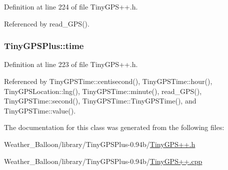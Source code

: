 Definition at line 224 of file Tiny\+G\+P\+S++.\+h.



Referenced by read\+\_\+\+G\+P\+S().

\subsubsection[{\texorpdfstring{time}{time}}]{ Tiny\+G\+P\+S\+Plus\+::time}\hypertarget{class_tiny_g_p_s_plus_a377c975527fa24b45fb86356505eb134}{}\label{class_tiny_g_p_s_plus_a377c975527fa24b45fb86356505eb134}


Definition at line 223 of file Tiny\+G\+P\+S++.\+h.



Referenced by Tiny\+G\+P\+S\+Time\+::centisecond(), Tiny\+G\+P\+S\+Time\+::hour(), Tiny\+G\+P\+S\+Location\+::lng(), Tiny\+G\+P\+S\+Time\+::minute(), read\+\_\+\+G\+P\+S(), Tiny\+G\+P\+S\+Time\+::second(), Tiny\+G\+P\+S\+Time\+::\+Tiny\+G\+P\+S\+Time(), and Tiny\+G\+P\+S\+Time\+::value().



The documentation for this class was generated from the following files\+:\begin{DoxyCompactItemize}
\item 
Weather\+\_\+\+Balloon/library/\+Tiny\+G\+P\+S\+Plus-\/0.\+94b/\hyperlink{_tiny_g_p_s_09_09_8h}{Tiny\+G\+P\+S++.\+h}\item 
Weather\+\_\+\+Balloon/library/\+Tiny\+G\+P\+S\+Plus-\/0.\+94b/\hyperlink{_tiny_g_p_s_09_09_8cpp}{Tiny\+G\+P\+S++.\+cpp}\end{DoxyCompactItemize}

